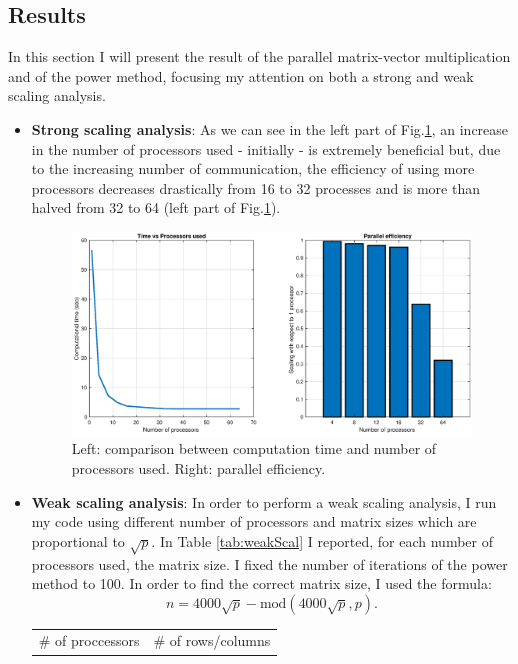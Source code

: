 \documentclass[unicode,11pt,a4paper,oneside,numbers=endperiod,openany]{scrartcl}
\begin{document}
\subsection{Results}
In this section I will present the result of the parallel matrix-vector multiplication and of the power method, focusing my attention on both a strong and weak scaling analysis.
\begin{itemize}
	\item \textbf{Strong scaling analysis}: As we can see in the left part of Fig.\ref{fig:strongScal}, an increase in the number of processors used - initially - is extremely beneficial but, due to the increasing number of communication, the efficiency of using more processors decreases drastically from 16 to 32 processes and is more than halved from 32 to 64 (left part of Fig.\ref{fig:strongScal}). 
	\begin{figure}[h!]
		\centering 
		\includegraphics[width=\textwidth]{images/strong_scal.eps}
		\caption{Left: comparison between computation time and number of processors used. Right: parallel efficiency.}
		\label{fig:strongScal}
	\end{figure}
	\item \textbf{Weak scaling analysis}: In order to perform a weak scaling analysis, I run my code using different number of processors and matrix sizes which are proportional to $\sqrt{p}$. In Table \ref{tab:weakScal} I reported, for each number of processors used, the matrix size. I fixed the number of iterations of the power method to 100. In order to find the correct matrix size, I used the formula:
	 \begin{equation*}
	 	n=4000\sqrt{p}-\text{mod}(4000\sqrt{p}, p).
	 \end{equation*}
	\begin{table}[h!]
		\centering
		\begin{tabular}{|c|c|}
			\hline
			\# of proccessors & \# of rows/columns \\

\end{tabular}
\end{table}
\end{itemize}
\end{document}

